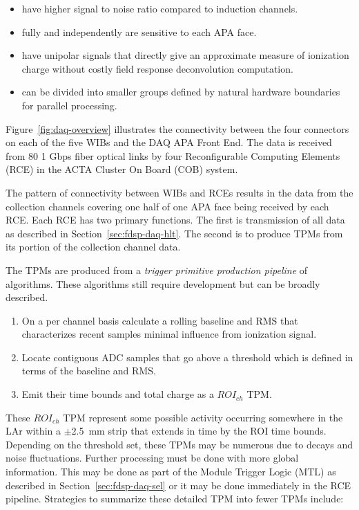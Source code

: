 \begin{itemize}
\item have higher signal to noise ratio compared to induction channels.
\item fully and independently are sensitive to each APA face.
\item have unipolar signals that directly give an approximate measure
  of ionization charge without costly field response deconvolution
  computation.
\item can be divided into smaller groups defined by natural hardware
  boundaries for parallel processing.
\end{itemize}


Figure~\ref{fig:daq-overview} illustrates the connectivity between the
four connectors on each of the five WIBs and the DAQ APA Front End.
The data is received from 80 1 Gbps fiber optical links by four
Reconfigurable Computing Elements (RCE) in the ACTA Cluster On Board
(COB) system. 

The pattern of connectivity between WIBs and RCEs results in the data
from the collection channels covering one half of one APA face being
received by each RCE.  Each RCE has two primary functions.  The first
is transmission of all data as described in
Section~\ref{sec:fdsp-daq-hlt}.  The second is to produce TPMs from
its portion of the collection channel data.

The TPMs are produced from a \textit{trigger primitive production
  pipeline} of algorithms.  These algorithms still require development
but can be broadly described.   

\begin{enumerate}
\item On a per channel basis calculate a rolling baseline and RMS that
  characterizes recent samples minimal influence from ionization
  signal.
\item Locate contiguous ADC samples that go above a threshold which is
  defined in terms of the baseline and RMS.
\item Emit their time bounds and total charge as a $ROI_{ch}$ TPM.
\end{enumerate}

These $ROI_{ch}$ TPM represent some possible activity occurring
somewhere in the LAr within a $\pm$\SI{2.5}{\mm} strip that extends in
time by the ROI time bounds.  Depending on the threshold set, these
TPMs may be numerous due to  decays and noise fluctuations.
Further processing must be done with more global information.  This
may be done as part of the Module Trigger Logic (MTL) as described in
Section~\ref{sec:fdsp-daq-sel} or it may be done immediately in the
RCE pipeline.  Strategies to summarize these detailed TPM into fewer
TPMs include:

